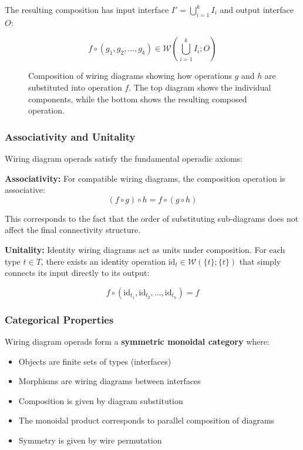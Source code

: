 The resulting composition has input interface $I' = \bigcup_{i=1}^k I_i$ and output interface $O$:

\begin{equation}
    f \circ (g_1, g_2, \ldots, g_k) \in \mathcal{W}\left(\bigcup_{i=1}^k I_i; O\right)
\end{equation}

\begin{figure}[h]
\centering

\caption{Composition of wiring diagrams showing how operations $g$ and $h$ are substituted into operation $f$. The top diagram shows the individual components, while the bottom shows the resulting composed operation.}
\label{fig:wiring-diagram-composition}
\end{figure}

\subsubsection{Associativity and Unitality}

Wiring diagram operads satisfy the fundamental operadic axioms:

\textbf{Associativity:} For compatible wiring diagrams, the composition operation is associative:
\begin{equation}
    (f \circ g) \circ h = f \circ (g \circ h)
\end{equation}

This corresponds to the fact that the order of substituting sub-diagrams does not affect the final connectivity structure.

\textbf{Unitality:} Identity wiring diagrams act as units under composition. For each type $t \in T$, there exists an identity operation $\text{id}_t \in \mathcal{W}(\{t\}; \{t\})$ that simply connects its input directly to its output:

\begin{equation}
    f \circ (\text{id}_{t_1}, \text{id}_{t_2}, \ldots, \text{id}_{t_n}) = f
\end{equation}

\subsubsection{Categorical Properties}

Wiring diagram operads form a \textbf{symmetric monoidal category} where:
\begin{itemize}
    \item Objects are finite sets of types (interfaces)
    \item Morphisms are wiring diagrams between interfaces
    \item Composition is given by diagram substitution
    \item The monoidal product corresponds to parallel composition of diagrams
    \item Symmetry is given by wire permutation
\end{itemize}

